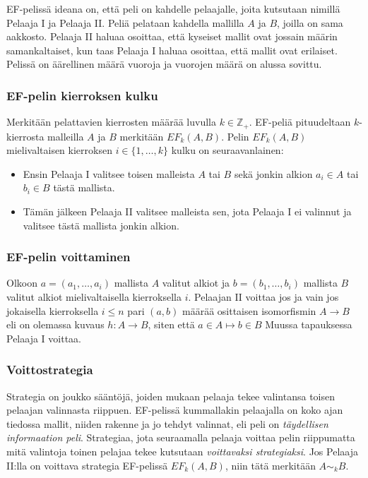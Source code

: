 \documentclass{beamer}
\begin{document}
\begin{frame}
EF-pelissä ideana on, että peli on kahdelle pelaajalle, joita kutsutaan nimillä Pelaaja I ja Pelaaja II. Peliä pelataan kahdella mallilla $A$ ja $B$, joilla on sama aakkosto. Pelaaja II haluaa osoittaa, että kyseiset mallit ovat jossain määrin samankaltaiset, kun taas Pelaaja I haluaa osoittaa, että mallit ovat erilaiset. Pelissä on äärellinen määrä vuoroja ja vuorojen määrä on alussa sovittu.
\end{frame}

\begin{frame}
\frametitle{EF-pelin kierroksen kulku}
Merkitään pelattavien kierrosten määrää luvulla $k \in \mathbb{Z}_+$. EF-peliä pituudeltaan $k$-kierrosta malleilla $A$ ja $B$ merkitään $EF_k(A, B)$. Pelin $EF_k(A, B)$ mielivaltaisen kierroksen $i \in \{1, \ldots, k\}$ kulku on seuraavanlainen: 
\begin{itemize}
\item<2-> Ensin Pelaaja I valitsee toisen malleista $A$ tai $B$ sekä jonkin alkion $a_i \in A$ tai $b_i \in B$ tästä mallista.
\item<3-> Tämän jälkeen Pelaaja II valitsee malleista sen, jota Pelaaja I ei valinnut ja valitsee tästä mallista jonkin alkion.
\end{itemize}
\end{frame}

\begin{frame}
\frametitle{EF-pelin voittaminen}
Olkoon $a = (a_1, \ldots, a_i)$ mallista $A$ valitut alkiot ja $b = (b_1, \ldots, b_i)$ mallista $B$ valitut alkiot mielivaltaisella kierroksella $i$. \pause Pelaajan II voittaa jos ja vain jos jokaisella kierroksella $i \leq n$ pari $(a, b)$ määrää osittaisen isomorfismin $A \rightarrow B$ eli on olemassa kuvaus $h: A \rightarrow B$, siten että $a \in A \mapsto b \in B$ \pause Muussa tapauksessa Pelaaja I voittaa.
\end{frame}

\begin{frame}
\frametitle{Voittostrategia}
Strategia on joukko sääntöjä, joiden mukaan pelaaja tekee valintansa toisen pelaajan valinnasta riippuen. \pause EF-pelissä kummallakin pelaajalla on koko ajan tiedossa mallit, niiden rakenne ja jo tehdyt valinnat, eli peli on \textit{täydellisen informaation peli}. \pause Strategiaa, jota seuraamalla pelaaja voittaa pelin riippumatta mitä valintoja toinen pelajaa tekee kutsutaan \textit{voittavaksi strategiaksi}. \pause Jos Pelaaja II:lla on voittava strategia EF-pelissä $EF_k(A, B)$, niin tätä merkitään $A \sim_k B$.
\end{frame}
\end{document}
